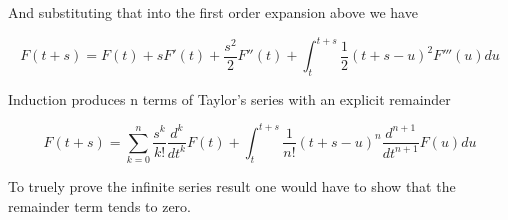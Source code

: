 \documentclass{article}      %
\begin{document}
And substituting that into the first order expansion above we have

\[
F(t+s) = F(t) + s F'(t) + \frac{s^2}{2} F''(t) + \int_{t}^{t+s} \frac{1}{2}(t+s-u)^2 F'''(u) du
\]

Induction produces n terms of Taylor's series with an explicit remainder

\[
F(t+s) = \sum_{k=0}^{n} \frac{s^k}{k!} \frac{d^k}{dt^k} F(t) +
                        \int_{t}^{t+s} \frac{1}{n!}(t+s-u)^n \frac{d^{n+1}}{dt^{n+1}} F(u) du
\]

To truely prove the infinite series result one would have to show that the remainder term tends to zero.
\end{document}
